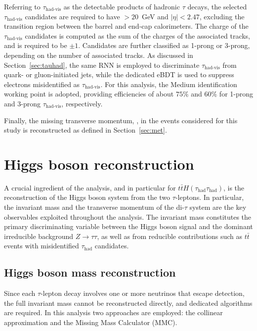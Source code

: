Referring to $\tau_{\text{had-vis}}$ as the detectable products of hadronic $\tau$ decays, the selected $\tau_{\text{had-vis}}$ candidates are required to have \pt$ > 20$~GeV and $|\eta| < 2.47$, excluding the transition region between the barrel and end-cap calorimeters. The charge of the $\tau_{\text{had-vis}}$ candidates is computed as the sum of the charges of the associated tracks, and is required to be $\pm 1$. Candidates are further classified as 1-prong or 3-prong, depending on the number of associated tracks. As discussed in Section~\ref{sec:tauhad}, the same RNN is employed to discriminate $\tau_{\text{had-vis}}$ from quark- or gluon-initiated jets, while the dedicated eBDT is used to suppress electrons misidentified as $\tau_{\text{had-vis}}$. For this analysis, the Medium identification working point is adopted, providing efficiencies of about $75\%$ and $60\%$ for 1-prong and 3-prong $\tau_{\text{had-vis}}$, respectively.  

Finally, the missing transverse momentum, \etmiss, in the events considered for this study is reconstructed as defined in Section~\ref{sec:met}.

\section{Higgs boson reconstruction}
\label{sec:higgs_reconstruction}

A crucial ingredient of the \htautau analysis, and in particular for $t\bar{t}H(\tau_{\text{had}}\tau_{\text{had}})$, is the reconstruction of the Higgs boson system from the two $\tau$-leptons. In particular, the invariant mass and the transverse momentum of the di-$\tau$ system are the key observables exploited throughout the analysis. The invariant mass constitutes the primary discriminating variable between the Higgs boson signal and the dominant irreducible background $Z\to\tau\tau$, as well as from reducible contributions such as $t\bar{t}$ events with misidentified $\tau_{\text{had}}$ candidates. 

\subsection{Higgs boson mass reconstruction}
\label{subsec:higgs_pt}

Since each $\tau$-lepton decay involves one or more neutrinos that escape detection, the full invariant mass cannot be reconstructed directly, and dedicated algorithms are required. In this analysis two approaches are employed: the collinear approximation and the Missing Mass Calculator (MMC).  

